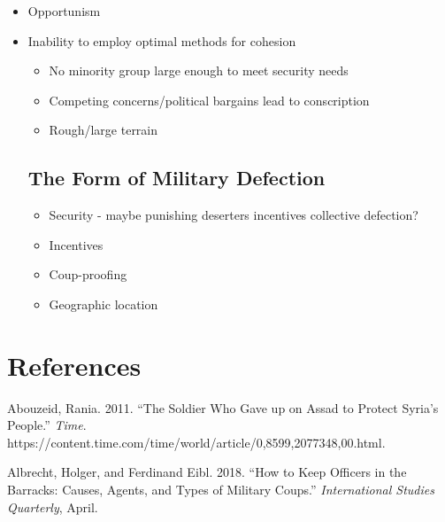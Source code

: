 \documentclass[12pt,]{article}
\providecommand{\tightlist}{%
  \setlength{\itemsep}{0pt}\setlength{\parskip}{0pt}}
\begin{document}
\begin{itemize}
\tightlist
\item
  Opportunism
\item
  Inability to employ optimal methods for cohesion

  \begin{itemize}
  \tightlist
  \item
    No minority group large enough to meet security needs
  \item
    Competing concerns/political bargains lead to conscription
  \item
    Rough/large terrain
  \end{itemize}

  \hypertarget{the-form-of-military-defection}{%
  \subsection{The Form of Military Defection}\label{the-form-of-military-defection}}

  \begin{itemize}
  \tightlist
  \item
    Security - maybe punishing deserters incentives collective defection?
  \item
    Incentives
  \item
    Coup-proofing
  \item
    Geographic location
  \end{itemize}
\end{itemize}

\hypertarget{references}{%
\section*{References}\label{references}}


\indent

\setlength{\parindent}{-0.2in}
\setlength{\leftskip}{0.2in}
\setlength{\parskip}{8pt}

\singlespacing

\hypertarget{refs}{}
\leavevmode\hypertarget{ref-Abouzeid2011}{}%
Abouzeid, Rania. 2011. ``The Soldier Who Gave up on Assad to Protect Syria's People.'' \emph{Time}. https://content.time.com/time/world/article/0,8599,2077348,00.html.

\leavevmode\hypertarget{ref-Albrecht2018a}{}%
Albrecht, Holger, and Ferdinand Eibl. 2018. ``How to Keep Officers in the Barracks: Causes, Agents, and Types of Military Coups.'' \emph{International Studies Quarterly}, April.
\end{document}
